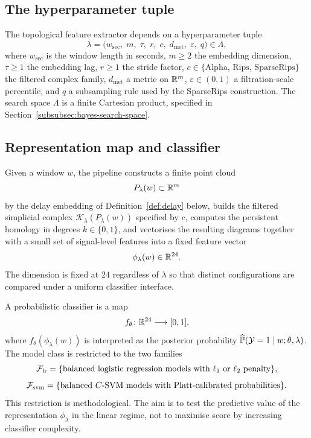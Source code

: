 \subsection{The hyperparameter tuple}

The topological feature extractor depends on a hyperparameter tuple
\begin{equation}
  \lambda=\bigl(w_{\mathrm{sec}},\;m,\;\tau,\;r,\;c,\;d_{\mathrm{met}},\;\varepsilon,\;q\bigr)\in\Lambda,
  \label{eq:lambda}
\end{equation}
where $w_{\mathrm{sec}}$ is the window length in seconds, $m\geq 2$ the embedding dimension, $\tau\geq 1$ the embedding lag, $r\geq 1$ the stride factor, $c\in\{\mathrm{Alpha},\,\mathrm{Rips},\,\mathrm{SparseRips}\}$ the filtered complex family, $d_{\mathrm{met}}$ a metric on $\mathbb{R}^m$, $\varepsilon\in(0,1)$ a filtration-scale percentile, and $q$ a subsampling rule used by the SparseRips construction. The search space $\Lambda$ is a finite Cartesian product, specified in Section~\ref{subsubsec:bayes-search-space}.

\subsection{Representation map and classifier}

Given a window $w$, the pipeline constructs a finite point cloud
\[
  P_\lambda(w)\subset\mathbb{R}^m
\]
by the delay embedding of Definition~\ref{def:delay} below, builds the filtered simplicial complex $\mathcal{K}_\lambda(P_\lambda(w))$ specified by $c$, computes the persistent homology in degrees $k\in\{0,1\}$, and vectorises the resulting diagrams together with a small set of signal-level features into a fixed feature vector
\begin{equation}
  \phi_\lambda(w)\in\mathbb{R}^{24}.
  \label{eq:phi-lambda}
\end{equation}
The dimension is fixed at $24$ regardless of $\lambda$ so that distinct configurations are compared under a uniform classifier interface.

A probabilistic classifier is a map
\[
  f_\theta\colon\mathbb{R}^{24}\longrightarrow[0,1],
\]
where $f_\theta(\phi_\lambda(w))$ is interpreted as the posterior probability $\widehat{\mathbb{P}}(\mathcal{Y}=1\mid w;\theta,\lambda)$. The model class is restricted to the two families
\[
  \mathcal{F}_{\mathrm{lr}}=\{\text{balanced logistic regression models with } \ell_1\text{ or } \ell_2\text{ penalty}\},
\]
\[
  \mathcal{F}_{\mathrm{svm}}=\{\text{balanced } C\text{-SVM models with Platt-calibrated probabilities}\}.
\]
This restriction is methodological. The aim is to test the predictive value of the representation $\phi_\lambda$ in the linear regime, not to maximise score by increasing classifier complexity.

